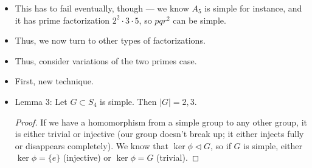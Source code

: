 \documentclass[../notes.tex]{subfiles}
\begin{document}
\begin{itemize}
\begin{proof}
        New technique: Because of these congruences, the number of $p$-Sylows cannot be really small (congruence obstructions). But we also know that it can't be too big. If there are that many elements of order $p$, we will crowd out the elements of other orders. We know that $n_q\equiv 1\mod q$, and $n_q\mid pr$. $n_q=1$ gives a contradiction. $n_q\not\equiv r$ because $n>r$. Thus, $n_q\in\{p,pr\}$. Doing the same thing for $n_r$, we get three possibilities: $p,q,pr$. Next step: Count elements. How many elements of order $p$ are in $G$?\par
        Proposition: If $p\mid |G|$ exactly, then any two distinct $p$-Sylows have only trivial intersection. The number of $g\in G$ of order $p$ is equal to $n_p(p-1)$.\par
        Because $p$ exactly divides $p$, each $p$-Sylow is a subgroup of order $p$, but their intersection is a subgroup and thus has to divide the order (Lagrange's theorem). Thus, the order of the intersection is either 1 or $p$. Thus, all elements of order $p$ lie in trivially intersecting $p$-Sylows. We count $p-1$ elements of order $p$ for each $p$-Sylow ($p$ minus the identity).\par
        Thus, since $p\,||\,|G|$ in this case, we know that the number of $g\in G$ with $|g|=p$ is $n_p(p-1)=qr(p-1)$. The number of $g\in G$ with $|g|=q$ is $n_q(q-1)\geq p(q-1)$. The number of $g\in G$ with $|g|=r$ is $n_r(r-1)\geq q(r-1)$. Counting the number of elements and the identity, we get
        \begin{equation*}
            qr(p-1)+p(q-1)+q(r-1)+1 = qrp+pq-p-q+1
            = pqr+(p-1)(q-1)
            > pqr
            = |G|
        \end{equation*}
        a contradiction.
    \end{proof}
    \item This has to fail eventually, though --- we know $A_5$ is simple for instance, and it has prime factorization $2^2\cdot 3\cdot 5$, so $pqr^2$ can be simple.
    \item Thus, we now turn to other types of factorizations.
    \item Thus, consider variations of the two primes case.
    \item First, new technique.
    \item Lemma 3: Let $G\subset S_4$ is simple. Then $|G|=2,3$.
    \begin{proof}
        If we have a homomorphism from a simple group to any other group, it is either trivial or injective (our group doesn't break up; it either injects fully or disappears completely). We know that $\ker\phi\triangleleft G$, so if $G$ is simple, either $\ker\phi=\{e\}$ (injective) or $\ker\phi=G$ (trivial).\par

\end{proof}
\end{itemize}
\end{document}
